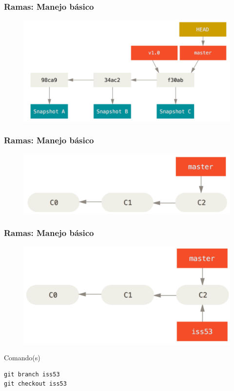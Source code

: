 \documentclass{beamer}
\begin{document}
\begin{frame}
\frametitle{Ramas: Manejo básico}
\begin{figure}
\includegraphics[width=0.85\linewidth]{img/branching-0.png}
\end{figure}
\end{frame}

\begin{frame}
\frametitle{Ramas: Manejo básico}
\begin{figure}
\includegraphics[width=0.85\linewidth]{img/branching-1.png}
\end{figure}
\end{frame}

\begin{frame}[fragile]
\frametitle{Ramas: Manejo básico}
\begin{figure}
\includegraphics[width=0.85\linewidth]{img/branching-2.png}
\end{figure}
\vskip 0.50cm
\footnotesize
\begin{block}{Comando(s)}
\begin{verbatim}
git branch iss53
git checkout iss53
\end{verbatim}
\end{block}
\end{frame}
\end{document}
